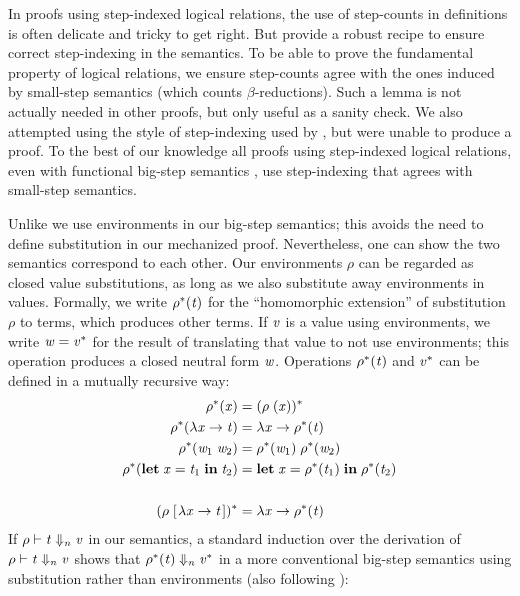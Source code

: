 In proofs using step-indexed logical relations, the use of
step-counts in definitions is often delicate and tricky to get
right.
But \citeauthor*{Acar08} provide a robust recipe to ensure
correct step-indexing in the semantics.
To be able to prove the fundamental property of logical relations,
we ensure step-counts agree with the ones induced by small-step
semantics (which counts $\beta$-reductions). Such a lemma is not
actually needed in other proofs, but only useful as a sanity
check.
We also attempted using the style of step-indexing
used by \citet{Amin2017Type}, but were unable to produce a proof. To
the best of our knowledge all proofs using step-indexed logical
relations, even with functional big-step semantics
\citep{Owens2016functional}, use step-indexing that agrees with
small-step semantics.

Unlike \citeauthor*{Acar08} we use environments in our big-step
semantics; this avoids the need to define substitution in our
mechanized proof. Nevertheless, one can show the two semantics
correspond to each other.
Our environments \ensuremath{\rho} can be regarded as closed value
substitutions, as long as we also substitute away environments in values.
Formally,
we write \ensuremath{\rho^*(\Varid{t})} for the ``homomorphic extension'' of
substitution \ensuremath{\rho} to terms, which produces other terms.
If \ensuremath{\Varid{v}} is a value using environments, we write \ensuremath{\Varid{w}\mathrel{=}\Varid{v}^*} for the
result of translating that value to not use environments; this
operation produces a closed neutral form \ensuremath{\Varid{w}}. Operations \ensuremath{\rho^*(\Varid{t})} and \ensuremath{\Varid{v}^*} can be defined in a mutually recursive way:
\begin{align*}
  \rho^*(\mathit{x}) &= (\rho\;(\mathit{x}))^*\\
  \rho^*(\lambda \mathit{x}\to \mathit{t}) &= \lambda \mathit{x}\to \rho^*(\mathit{t})\\
  \rho^*(\mathit{w}_{1}\;\mathit{w}_{2}) &= \rho^*(\mathit{w}_{1})\;\rho^*(\mathit{w}_{2})\\
  \rho^*(\mathbf{let}\;\mathit{x}\mathrel{=}\mathit{t}_{1}\;\mathbf{in}\;\mathit{t}_{2}) &= \mathbf{let}\;\mathit{x}\mathrel{=}\rho^*(\mathit{t}_{1})\;\mathbf{in}\;\rho^*(\mathit{t}_{2})\\
  \\
  (\rho\;[\mskip1.5mu \lambda \mathit{x}\to \mathit{t}\mskip1.5mu])^* &= \lambda \mathit{x}\to \rho^*(\mathit{t})
\end{align*}
If \ensuremath{\rho\vdash\Varid{t}\Downarrow_{\Varid{n}}\Varid{v}} in our semantics,
a standard induction over the derivation of \ensuremath{\rho\vdash\Varid{t}\Downarrow_{\Varid{n}}\Varid{v}}
shows that \ensuremath{\rho^*(\Varid{t})\Downarrow_{\Varid{n}}\Varid{v}^*}
in a more conventional big-step
semantics using substitution rather than environments (also
following \citeauthor*{Acar08}):

